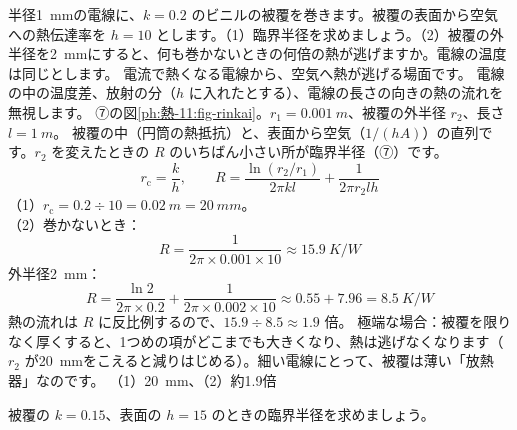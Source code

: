 \label{ph:熱-11:ex5}
\begin{phreidai}[電線の被覆の臨界半径]
半径\qty{1}{mm}の電線に、$k=0.2$ のビニルの被覆を巻きます。被覆の表面から空気への熱伝達率を $h=10$ とします。（1）臨界半径を求めましょう。（2）被覆の外半径を\qty{2}{mm}にすると、何も巻かないときの何倍の熱が逃げますか。電線の温度は同じとします。
\phbamen
電流で熱くなる電線から、空気へ熱が逃げる場面です。
\phmushi
電線の中の温度差、放射の分（$h$ に入れたとする）、電線の長さの向きの熱の流れを無視します。
\phzu
⑦の図\ref{ph:熱-11:fig-rinkai}。$r_1=\qty{0.001}{m}$、被覆の外半径 $r_2$、長さ $l=\qty{1}{m}$。
\phriyu
被覆の中（円筒の熱抵抗）と、表面から空気（$1/(hA)$）の直列です。$r_2$ を変えたときの $R$ のいちばん小さい所が臨界半径（⑦）です。
\phtateru
\[r_{\mathrm c}=\frac{k}{h},\qquad R=\frac{\ln(r_2/r_1)}{2\pi kl}+\frac{1}{2\pi r_2lh}\]
\phtoku
（1）$r_{\mathrm c}=0.2\div10=\qty{0.02}{m}=\qty{20}{mm}$。\\
（2）巻かないとき：\[R=\frac{1}{2\pi\times0.001\times10}\approx\qty{15.9}{K/W}\]
外半径\qty{2}{mm}：\[R=\frac{\ln2}{2\pi\times0.2}+\frac{1}{2\pi\times0.002\times10}\approx0.55+7.96=\qty{8.5}{K/W}\]
熱の流れは $R$ に反比例するので、$15.9\div8.5\approx1.9$ 倍。
\phtashikame
極端な場合：被覆を限りなく厚くすると、1つめの項がどこまでも大きくなり、熱は逃げなくなります（$r_2$ が\qty{20}{mm}をこえると減りはじめる）。細い電線にとって、被覆は薄い「放熱器」なのです。
\kotae （1）\qty{20}{mm}、（2）約1.9倍
\end{phreidai}
\begin{jibun}
被覆の $k=0.15$、表面の $h=15$ のときの臨界半径を求めましょう。
\end{jibun}


